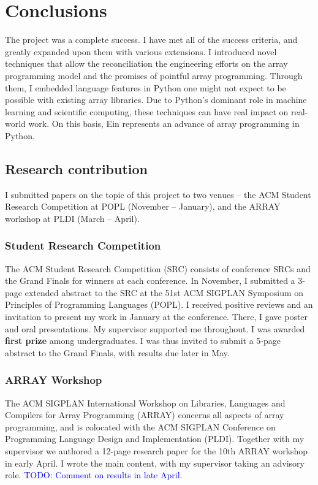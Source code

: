\chapter{Conclusions}

The project was a complete success. 
I have met all of the success criteria, and greatly expanded upon them with various extensions. 
I introduced novel techniques that allow the reconciliation the engineering efforts on the array programming model and the promises of pointful array programming. 
Through them, I embedded language features in Python one might not expect to be possible with existing array libraries. 
Due to Python's dominant role in machine learning and scientific computing, these techniques can have real impact on real-world work. 
On this basis, Ein represents an advance of array programming in Python.

\section{Research contribution}
\label{research-contribution}

I submitted papers on the topic of this project to two venues -- the ACM Student Research Competition at POPL (November -- January), and the ARRAY workshop at PLDI (March -- April).

\subsection{Student Research Competition}

The ACM Student Research Competition (SRC) consists of conference SRCs and the Grand Finals for winners at each conference. In November, I submitted a 3-page extended abstract to the SRC at the 51st ACM SIGPLAN Symposium on Principles of Programming Languages (POPL).
I received positive reviews and an invitation to present my work in January at the conference. 
There, I gave poster and oral presentations.
My supervisor supported me throughout.
I was awarded \textbf{first prize} among undergraduates. 
I was thus invited to submit a 5-page abstract to the Grand Finals, with results due later in May.

\subsection{ARRAY Workshop}

The ACM SIGPLAN International Workshop on Libraries, Languages and Compilers for Array Programming (ARRAY) concerns all aspects of array programming, and is colocated with the ACM SIGPLAN Conference on Programming Language Design and Implementation (PLDI). Together with my supervisor we authored a 12-page research paper for the 10th ARRAY workshop in early April. I wrote the main content, with my supervisor taking an advisory role. \textcolor{blue}{TODO: Comment on results in late April.}

